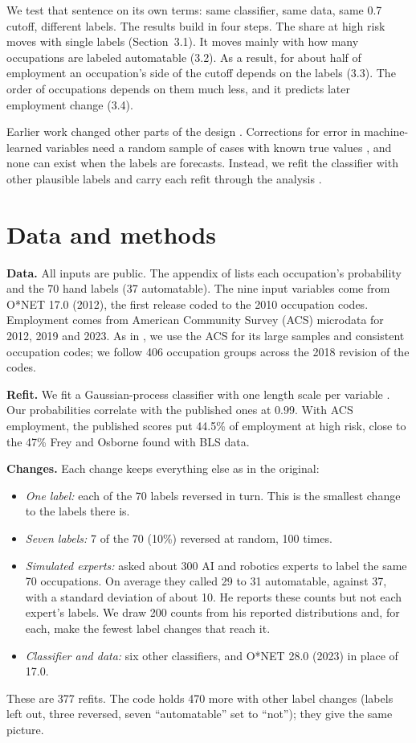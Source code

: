 \documentclass[11pt]{article}
\begin{document}
We test that sentence on its own terms: same classifier, same data, same 0.7 cutoff, different labels.
The results build in four steps. The share at high risk moves with single labels (Section~3.1). It moves
mainly with how many occupations are labeled automatable (3.2). As a result, for about half of employment
an occupation's side of the cutoff depends on the labels (3.3). The order of occupations depends on them
much less, and it predicts later employment change (3.4).

Earlier work changed other parts of the design \citep{arntz2016, lorenz2023, coelli2019}. Corrections
for error in machine-learned variables need a random sample of cases with known true values
\citep{egami2023, battaglia2024}, and none can exist when the labels are forecasts. Instead, we refit the
classifier with other plausible labels and carry each refit through the analysis \citep{knox2022}.

\section{Data and methods}
\textbf{Data.} All inputs are public. The appendix of \citet{frey2013} lists each occupation's
probability and the 70 hand labels (37 automatable). The nine input variables come from O*NET 17.0
(2012), the first release coded to the 2010 occupation codes. Employment comes from American Community
Survey (ACS) microdata for 2012, 2019 and 2023. As in \citet{autor2013}, we use the ACS for its large
samples and consistent occupation codes; we follow 406 occupation groups across the 2018 revision of the
codes.

\textbf{Refit.} We fit a Gaussian-process classifier with one length scale per variable
\citep{rasmussen2006}. Our probabilities correlate with the published ones at 0.99. With ACS employment, the published scores put 44.5\% of
employment at high risk, close to the 47\% Frey and Osborne found with BLS data.

\textbf{Changes.} Each change keeps everything else as in the original:
\begin{itemize}\setlength{\itemsep}{0pt}
\item \emph{One label:} each of the 70 labels reversed in turn. This is the smallest change to the
labels there is.
\item \emph{Seven labels:} 7 of the 70 (10\%) reversed at random, 100 times.
\item \emph{Simulated experts:} \citet{walsh2018} asked about 300 AI and robotics experts to label the same
70 occupations. On average they called 29 to 31 automatable, against 37, with a standard deviation of
about 10. He reports these counts but not each expert's labels. We draw 200 counts from his reported
distributions and, for each, make the fewest label changes that reach it.
\item \emph{Classifier and data:} six other classifiers, and O*NET 28.0 (2023) in place of 17.0.
\end{itemize}
These are 377 refits. The code holds 470 more with other label changes (labels left out, three
reversed, seven ``automatable'' set to ``not''); they give the same picture.
\end{document}
